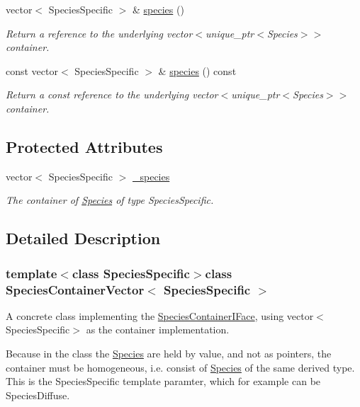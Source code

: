 \begin{DoxyCompactItemize}
vector$<$ Species\+Specific $>$ \& \hyperlink{classSpeciesContainerVector_a8b06733868c457e24299cb6dd0acbc1b}{species} ()
\begin{DoxyCompactList}\small\item\em Return a reference to the underlying vector$<$unique\+\_\+ptr$<$\+Species$>$$>$ container. \end{DoxyCompactList}\item 
const vector$<$ Species\+Specific $>$ \& \hyperlink{classSpeciesContainerVector_a18ec9210085962c6350b8e980cf14a6f}{species} () const 
\begin{DoxyCompactList}\small\item\em Return a const reference to the underlying vector$<$unique\+\_\+ptr$<$\+Species$>$$>$ container. \end{DoxyCompactList}\end{DoxyCompactItemize}
\subsection*{Protected Attributes}
\begin{DoxyCompactItemize}
\item 
vector$<$ Species\+Specific $>$ \hyperlink{classSpeciesContainerVector_a0dde776cfb79686cc42cfa41ce546f45}{\+\_\+species}
\begin{DoxyCompactList}\small\item\em The container of \hyperlink{classSpecies}{Species} of type Species\+Specific. \end{DoxyCompactList}\end{DoxyCompactItemize}


\subsection{Detailed Description}
\subsubsection*{template$<$class Species\+Specific$>$class Species\+Container\+Vector$<$ Species\+Specific $>$}

A concrete class implementing the \hyperlink{classSpeciesContainerIFace}{Species\+Container\+I\+Face}, using vector$<$\+Species\+Specific$>$ as the container implementation. 

Because in the class the \hyperlink{classSpecies}{Species} are held by value, and not as pointers, the container must be homogeneous, i.\+e. consist of \hyperlink{classSpecies}{Species} of the same derived type. This is the Species\+Specific template paramter, which for example can be Species\+Diffuse.

